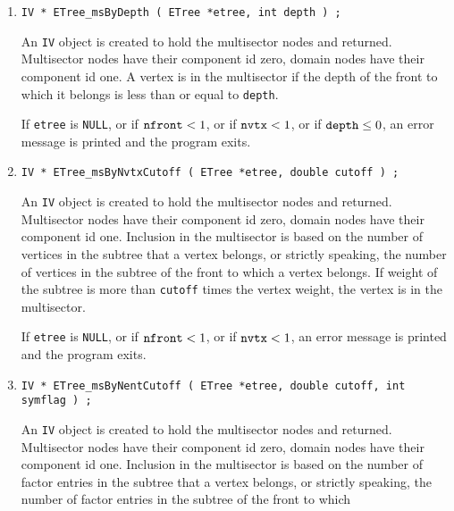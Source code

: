 \begin{enumerate}
\item
\begin{verbatim}
IV * ETree_msByDepth ( ETree *etree, int depth ) ;
\end{verbatim}
An {\tt IV} object is created to hold the multisector nodes
and returned.
Multisector nodes have their component id zero,
domain nodes have their component id one.
A vertex is in the multisector if the depth of the front to which 
it belongs is less than or equal to {\tt depth}.
\par {}
If {\tt etree} is {\tt NULL},
or if ${\tt nfront} < 1$,
or if ${\tt nvtx} < 1$,
or if ${\tt depth} \le 0$,
an error message is printed and the program exits.
\item
\begin{verbatim}
IV * ETree_msByNvtxCutoff ( ETree *etree, double cutoff ) ;
\end{verbatim}
An {\tt IV} object is created to hold the multisector nodes
and returned.
Multisector nodes have their component id zero,
domain nodes have their component id one.
Inclusion in the multisector is based on the number of vertices
in the subtree that a vertex belongs, or strictly speaking, the
number of vertices in the subtree of the front to which a vertex
belongs.
If weight of the subtree is more than {\tt cutoff} times the vertex
weight, the vertex is in the multisector.
\par {}
If {\tt etree} is {\tt NULL},
or if ${\tt nfront} < 1$,
or if ${\tt nvtx} < 1$,
an error message is printed and the program exits.
\item
\begin{verbatim}
IV * ETree_msByNentCutoff ( ETree *etree, double cutoff, int symflag ) ;
\end{verbatim}
An {\tt IV} object is created to hold the multisector nodes
and returned.
Multisector nodes have their component id zero,
domain nodes have their component id one.
Inclusion in the multisector is based on the number of factor
entries in the subtree that a vertex belongs, or strictly speaking, 
the number of factor entries in the subtree of the front to which 

\end{enumerate}
